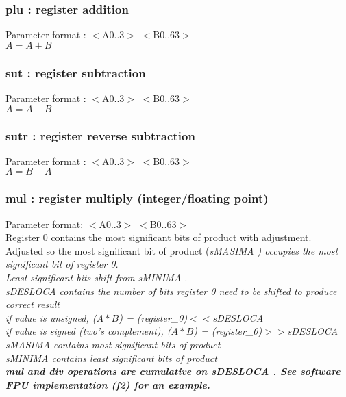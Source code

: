 \documentclass[a4paper,11pt]{article}
\begin{document}
\subsubsection{plu : register addition} 
 Parameter format : $<$A0..3$>$ $<$B0..63$>$\\ 
 $A = A + B$

\subsubsection{sut : register subtraction} 
 Parameter format : $<$A0..3$>$ $<$B0..63$>$ \\
 $A = A - B$

\subsubsection{sutr : register reverse subtraction} 
 Parameter format : $<$A0..3$>$ $<$B0..63$>$ \\
 $A = B - A$

\subsubsection{mul : register multiply (integer/floating point)} 
 Parameter format: $<$A0..3$>$ $<$B0..63$>$\\
 Register 0 contains the most significant bits of product with adjustment. \\
  Adjusted so the most significant bit of product (\sl sMASIMA \rm) occupies the most significant bit of register 0.\\
  Least significant bits shift from \sl sMINIMA \rm.\\
 \sl sDESLOCA \rm contains the number of bits register 0 need to be shifted to produce correct result\\
  if value is unsigned, ($A*B$) = (register\_0)$<<$\sl sDESLOCA \rm\\
  if value is signed (two's complement), ($A*B$) = (register\_0)$>>$\sl sDESLOCA \rm\\
 \sl sMASIMA \rm contains most significant bits of product\\
 \sl sMINIMA \rm contains least significant bits of product\\
 
 \bf mul \rm and \bf div \rm operations are cumulative on \sl sDESLOCA \rm. See software FPU implementation (f2) for an example.
 
\end{document}

